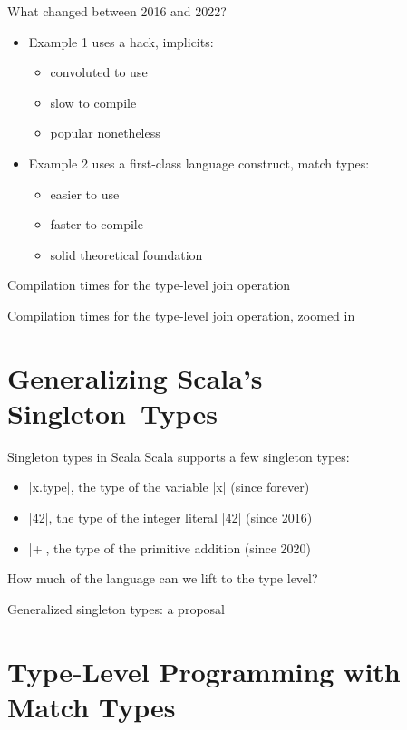 \documentclass[10pt]{beamer}
\newenvironment{slide}[2][]
  {\begin{frame}[fragile,environment=slide,#1]{#2}}
  {\end{frame}}
\begin{document}
\begin{slide}{What changed between 2016 and 2022?}
\begin{itemize}
  \item Example 1 uses a hack, implicits:
  \begin{itemize}
    \item convoluted to use
    \item slow to compile
    \item popular nonetheless
  \end{itemize}
  \pause
  \item Example 2 uses a first-class language construct, match types:
  \begin{itemize}
    \item easier to use
    \item faster to compile
    \item solid theoretical foundation
  \end{itemize}
\end{itemize}
\end{slide}

\begin{slide}{Compilation times for the type-level join operation}
\begin{center}

\end{center}
\end{slide}

\begin{slide}{Compilation times for the type-level join operation, zoomed in}
\begin{center}

\end{center}
\end{slide}

\section{Generalizing Scala's Singleton~Types}

\begin{slide}{Singleton types in Scala}
Scala supports a few singleton types:
\begin{itemize}
  \item |x.type|, the type of the variable |x| (since forever)
  \item |42|, the type of the integer literal |42| (since 2016)
  \item |+|, the type of the primitive addition (since 2020)
\end{itemize}
\pause
How much of the language can we lift to the type level?
\end{slide}

\begin{slide}{Generalized singleton types: a proposal}
\end{slide}



\section{Type-Level Programming with Match Types}
\end{document}
